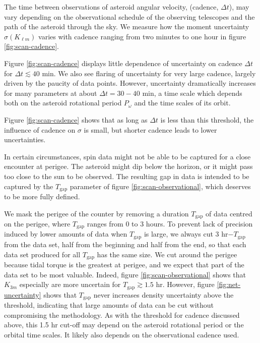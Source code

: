 \documentclass[fleqn,usenatbib]{mnras}
\begin{document}
The time between observations of asteroid angular velocity, (cadence, $\Delta t$), may vary depending on the observational schedule of the observing telescopes and the path of the asteroid through the sky.  We measure how the moment uncertainty $\sigma(K_{\ell m})$ varies with cadence ranging from two minutes to one hour in figure \ref{fig:scan-cadence}.

Figure \ref{fig:scan-cadence} displays little dependence of uncertainty on cadence $\Delta t$ for $\Delta t \lesssim 40$ min. We also see flaring of uncertainty for very large cadence, largely driven by the paucity of data points. However, uncertainty dramatically increases for many parameters at about $\Delta t = 30-40$ min, a time scale which depends both on the asteroid rotational period $P_\omega$ and the time scales of its orbit.

Figure \ref{fig:scan-cadence} shows that as long as $\Delta t$ is less than this threshold, the influence of cadence on $\sigma$ is small, but shorter cadence leads to lower uncertainties.

In certain circumstances, spin data might not be able to be captured for a close encounter at perigee. The asteroid might dip below the horizon, or it might pass too close to the sun to be observed. The resulting gap in data is intended to be captured by the $T_\text{gap}$ parameter of figure \ref{fig:scan-observational}, which deserves to be more fully defined.

We mask the perigee of the counter by removing a duration $T_\text{gap}$ of data centred on the perigee, where $T_\text{gap}$ ranges from 0 to 3 hours. To prevent lack of precision induced by lower amounts of data when $T_\text{gap}$ is large, we always cut 3 hr$-T_\text{gap}$ from the data set, half from the beginning and half from the end, so that each data set produced for all $T_\text{gap}$ has the same size. We cut around the perigee because tidal torque is the greatest at perigee, and we expect that part of the data set to be most valuable. Indeed, figure \ref{fig:scan-observational} shows that $K_{3m}$ especially are more uncertain for $T_\text{gap} \gtrsim 1.5$ hr. However, figure \ref{fig:net-uncertainty} shows that $T_\text{gap}$ never increases density uncertainty above the threshold, indicating that large amounts of data can be cut without compromising the methodology. As with the threshold for cadence discussed above, this 1.5 hr cut-off may depend on the asteroid rotational period or the orbital time scales. It likely also depends on the observational cadence used.
\end{document}
